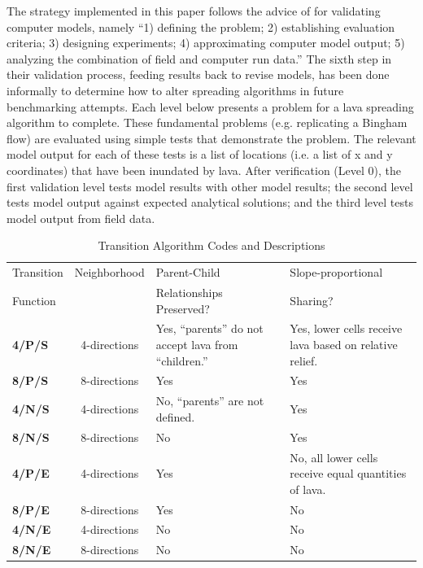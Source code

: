 \documentclass[12pt,letter]{article}
\begin{document}
	The strategy implemented in this paper follows the advice of \citet{bayarri2007framework} for validating computer models, namely ``1) defining the problem; 2) establishing evaluation criteria; 3) designing experiments; 4) approximating computer model output; 5) analyzing the combination of field and computer run data.'' The sixth step in their validation process, feeding results back to revise models, has been done informally to determine how to alter spreading algorithms in future benchmarking attempts. Each level below presents a problem for a lava spreading algorithm to complete. These fundamental problems (e.g. replicating a Bingham flow) are evaluated using simple tests that demonstrate the problem. The relevant model output for each of these tests is a list of locations (i.e. a list of x and y coordinates) that have been inundated by lava. After verification (Level 0), the first validation level tests model results with other model results; the second level tests model output against expected analytical solutions; and the third level tests model output from field data.

	\begin{center}
		\begin{table}[h]
		\caption{Transition Algorithm Codes and Descriptions}
		\begin{tabular}{l c p{5cm} p{5cm}}
			\toprule
			Transition&Neighborhood&Parent-Child&Slope-proportional\\
			Function&&Relationships Preserved?&Sharing?\\
			\midrule
			\textbf{4/P/S} &4-directions & Yes, ``parents'' do not accept lava from ``children.'' & Yes, lower cells receive lava based on relative relief.\\
			\textbf{8/P/S} &8-directions & Yes & Yes\\
			\textbf{4/N/S} &4-directions & No, ``parents'' are not defined. & Yes\\
			\textbf{8/N/S} &8-directions & No  & Yes\\
			\textbf{4/P/E} &4-directions & Yes & No, all lower cells receive equal quantities of lava.\\
			\textbf{8/P/E} &8-directions & Yes & No\\
			\textbf{4/N/E} &4-directions & No  & No\\
			\textbf{8/N/E} &8-directions & No  & No\\
			
			\bottomrule
		\end{tabular}
		\label{tab_algorithmcodes}
		\end{table}
	\end{center}
\end{document}
